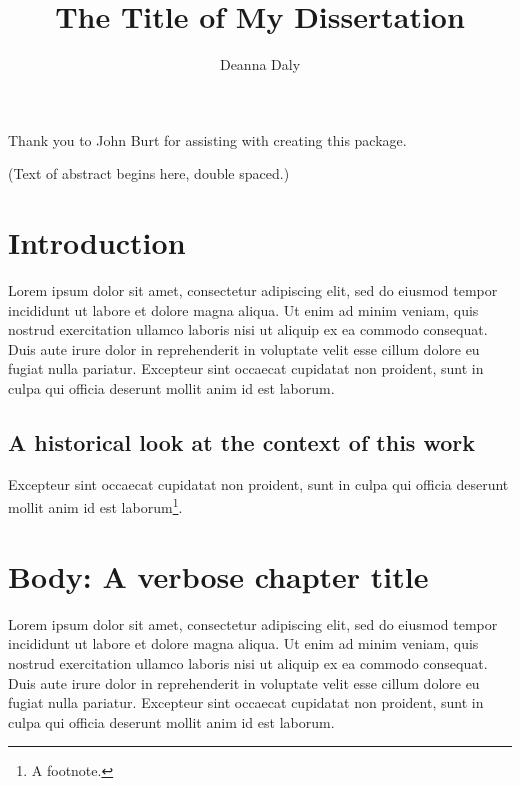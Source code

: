 \documentclass[openany]{brandeis-dissertation3.15}
\title{The Title of My Dissertation}
\author{Deanna Daly}
\begin{document}
\maketitlepage
\makeapproval

\begin{dissertation-acknowledgements}
Thank you to John Burt for assisting with creating this package.
\end{dissertation-acknowledgements}

\begin{dissertation-abstract}
(Text of abstract begins here, double spaced.) 

\end{dissertation-abstract}

\doublespacing


\pagestyle{toc}

\tableofcontents

\clearpage

\listoftables

\clearpage
    

\startbody

\chapter{Introduction}
Lorem ipsum dolor sit amet, consectetur adipiscing elit, sed do eiusmod tempor incididunt ut labore et dolore magna aliqua. Ut enim ad minim veniam, quis nostrud exercitation ullamco laboris nisi ut aliquip ex ea commodo consequat. Duis aute irure dolor in reprehenderit in voluptate velit esse cillum dolore eu fugiat nulla pariatur. Excepteur sint occaecat cupidatat non proident, sunt in culpa qui officia deserunt mollit anim id est laborum.

\section{A historical look at the context of this work}
Excepteur sint occaecat cupidatat non proident, sunt in culpa qui officia deserunt mollit anim id est laborum\footnote{A footnote.}.

\chapter{Body: A verbose chapter title}
Lorem ipsum dolor sit amet, consectetur adipiscing elit, sed do eiusmod tempor incididunt ut labore et dolore magna aliqua. Ut enim ad minim veniam, quis nostrud exercitation ullamco laboris nisi ut aliquip ex ea commodo consequat. Duis aute irure dolor in reprehenderit in voluptate velit esse cillum dolore eu fugiat nulla pariatur. Excepteur sint occaecat cupidatat non proident, sunt in culpa qui officia deserunt mollit anim id est laborum.
\end{document}
